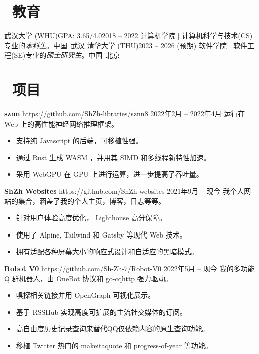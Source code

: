 \documentclass{common}
\begin{document}
\vspace{0.3ex}

\vspace{0.5ex}

\section{\faGraduationCap\ 教育}
\educationsubsection
    {武汉大学 (WHU)}{GPA: 3.65/4.0}{2018 -- 2022}
    {计算机学院 | 计算机科学与技术(CS)专业的\textit{本科生}。}{中国\ 武汉}
\educationsubsectionwithoutgpa
    {清华大学 (THU)}{2023 -- 2026 (预期)}
    {软件学院 | 软件工程(SE)专业的\textit{硕士研究生}。}{中国\ 北京}

\vspace{0.85ex}

\section{\faCubes\ 项目}
\projectsubsection
    {\textbf{sznn}}
    {https://github.com/ShZh-libraries/sznn}{8}
    {2022年2月 -- 2022年4月}
运行在 Web 上的高性能神经网络推理框架。
\begin{itemize}
    \item 支持纯 Javascript 的后端，可移植性强。
    \item 通过 Rust 生成 WASM ，并用其 SIMD 和多线程新特性加速。
    \item 采用 WebGPU 在 GPU 上进行运算，进一步提高了吞吐量。
\end{itemize}
\projectsubsectionwithoutstar
    {\textbf{ShZh Websites}}
    {https://github.com/ShZh-websites}
    {2021年9月 -- 现今}
我个人网站的集合，涵盖了我的个人主页，博客，日志等等。
\begin{itemize}
    \item 针对用户体验高度优化， Lighthouse 高分保障。
    \item 使用了 Alpine, Tailwind 和 Gatsby 等现代 Web 技术。
    \item 拥有适配各种屏幕大小的响应式设计和自适应的黑暗模式。
\end{itemize}
\projectsubsectionwithoutstar
    {\textbf{Robot V0}}
    {https://github.com/Sh-Zh-7/Robot-V0}
    {2022年5月 -- 现今}
我的多功能 Q 群机器人，由 OneBot 协议和 go-cqhttp 强力驱动。
\begin{itemize}
    \item 嗅探相关链接并用 OpenGraph 可视化展示。
    \item 基于 RSSHub 实现高度可扩展的主流社交媒体的订阅。
    \item 高自由度历史记录查询来替代QQ仅依赖内容的原生查询功能。
    \item 移植 Twitter 热门的 makeitaquote 和 progress-of-year 等功能。
\end{itemize}
\end{document}
